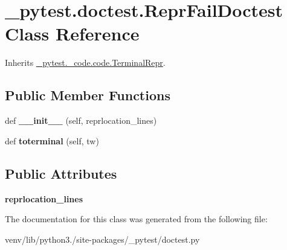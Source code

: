 \hypertarget{class__pytest_1_1doctest_1_1_repr_fail_doctest}{}\section{\+\_\+pytest.\+doctest.\+Repr\+Fail\+Doctest Class Reference}
\label{class__pytest_1_1doctest_1_1_repr_fail_doctest}


Inherits \hyperlink{class__pytest_1_1__code_1_1code_1_1_terminal_repr}{\+\_\+pytest.\+\_\+code.\+code.\+Terminal\+Repr}.

\subsection*{Public Member Functions}
\begin{DoxyCompactItemize}
\item 
\mbox{\label{class__pytest_1_1doctest_1_1_repr_fail_doctest_a00be950b13ed93e3d0834f526f48f466}} 
def {\bfseries \+\_\+\+\_\+init\+\_\+\+\_\+} (self, reprlocation\+\_\+lines)
\item 
\mbox{\label{class__pytest_1_1doctest_1_1_repr_fail_doctest_a839b57f7326c96bcc4bfacdc3108a5bd}} 
def {\bfseries toterminal} (self, tw)
\end{DoxyCompactItemize}
\subsection*{Public Attributes}
\begin{DoxyCompactItemize}
\item 
\mbox{\label{class__pytest_1_1doctest_1_1_repr_fail_doctest_a43b75a05efed840c3f8fdf8cf6d7c453}} 
{\bfseries reprlocation\+\_\+lines}
\end{DoxyCompactItemize}


The documentation for this class was generated from the following file\+:\begin{DoxyCompactItemize}
\item 
venv/lib/python3./site-\/packages/\+\_\+pytest/doctest.\+py\end{DoxyCompactItemize}
